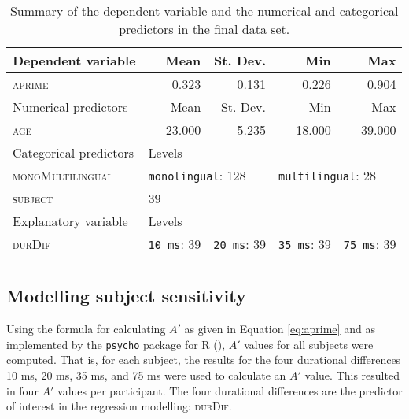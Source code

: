 \begin{table}\fontsize{10}{11}
\caption{Summary of the dependent variable and the numerical and categorical predictors in the final data set.}
\label{tab:6.10}
\centering
\begin{tabular}{lllll} 
\lsptoprule
Dependent variable     & \multicolumn{1}{r}{Mean}        & \multicolumn{1}{r}{St. Dev.}                 & \multicolumn{1}{r}{Min}         & \multicolumn{1}{r}{Max}                       \\ 
\midrule
\textsc{aprime}                 & \multicolumn{1}{r}{0.323}       & \multicolumn{1}{r}{0.131}                    & \multicolumn{1}{r}{0.226}       & \multicolumn{1}{r}{0.904}                     \\ 
\midrule
Numerical predictors   & \multicolumn{1}{r}{Mean}        & \multicolumn{1}{r}{St. Dev.}                 & \multicolumn{1}{r}{Min}         & \multicolumn{1}{r}{Max}                       \\ 
\midrule
\textsc{age}                    & \multicolumn{1}{r}{23.000}      & \multicolumn{1}{r}{5.235}                    & \multicolumn{1}{r}{18.000}      & \multicolumn{1}{r}{39.000}                    \\ 
\midrule
Categorical predictors & Levels      & ~                        & ~           & ~                         \\ 
\midrule
\textsc{monoMultilingual}       & \multicolumn{2}{l}{\texttt{monolingual}:
  128} & \multicolumn{2}{l}{\texttt{multilingual}:
  28}  \\
\textsc{subject}                & 39          & ~                        & ~           & ~                         \\ 
\midrule
Explanatory variable   & Levels      & ~                        & ~           & ~                         \\ 
\midrule
\textsc{durDif}                 & \texttt{10 ms}:
  39 & \texttt{20 ms}:
  39              & \texttt{35 ms}:
  39 & \texttt{75 ms}:
  39               \\
\lspbottomrule
\end{tabular}
\end{table}

\subsection{Modelling subject sensitivity}\label{section06_2_3}

Using the formula for calculating $A'$ as given in Equation \ref{eq:aprime} and as implemented by the \texttt{psycho} package for R (\cite{Makowski2018}), $A'$ values for all subjects were computed. That is, for each subject, the results for the four durational differences 10 ms, 20 ms, 35 ms, and 75 ms were used to calculate an $A'$ value. This resulted in four $A'$ values per participant. The four durational differences are the predictor of interest in the regression modelling: \textsc{durDif}.

